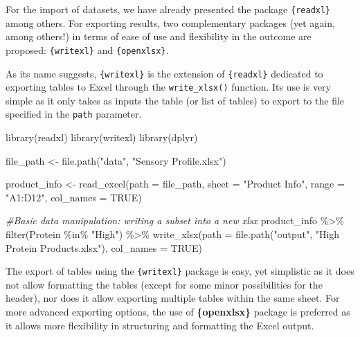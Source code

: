 \documentclass[
]{book}
\newenvironment{Shaded}{\begin{snugshade}}{\end{snugshade}}
\newcommand{\AttributeTok}[1]{\textcolor[rgb]{0.77,0.63,0.00}{#1}}
\newcommand{\CommentTok}[1]{\textcolor[rgb]{0.56,0.35,0.01}{\textit{#1}}}
\newcommand{\ConstantTok}[1]{\textcolor[rgb]{0.00,0.00,0.00}{#1}}
\newcommand{\FunctionTok}[1]{\textcolor[rgb]{0.00,0.00,0.00}{#1}}
\newcommand{\NormalTok}[1]{#1}
\newcommand{\OtherTok}[1]{\textcolor[rgb]{0.56,0.35,0.01}{#1}}
\newcommand{\SpecialCharTok}[1]{\textcolor[rgb]{0.00,0.00,0.00}{#1}}
\newcommand{\StringTok}[1]{\textcolor[rgb]{0.31,0.60,0.02}{#1}}
\begin{document}
For the import of datasets, we have already presented the package \texttt{\{readxl\}} among others. For exporting results, two complementary packages (yet again, among others!) in terms of ease of use and flexibility in the outcome are proposed: \texttt{\{writexl\}} and \texttt{\{openxlsx\}}.

As its name suggests, \texttt{\{writexl\}} is the extension of \texttt{\{readxl\}} dedicated to exporting tables to Excel through the \texttt{write\_xlsx()} function. Its use is very simple as it only takes as inputs the table (or list of tables) to export to the file specified in the \texttt{path} parameter.

\begin{Shaded}
\begin{Highlighting}[]
\FunctionTok{library}\NormalTok{(readxl)}
\FunctionTok{library}\NormalTok{(writexl)}
\FunctionTok{library}\NormalTok{(dplyr)}

\NormalTok{file\_path }\OtherTok{\textless{}{-}} \FunctionTok{file.path}\NormalTok{(}\StringTok{"data"}\NormalTok{, }\StringTok{"Sensory Profile.xlsx"}\NormalTok{)}

\NormalTok{product\_info }\OtherTok{\textless{}{-}} \FunctionTok{read\_excel}\NormalTok{(}\AttributeTok{path  =}\NormalTok{ file\_path,}
                           \AttributeTok{sheet =} \StringTok{"Product Info"}\NormalTok{,}
                           \AttributeTok{range =} \StringTok{"A1:D12"}\NormalTok{,}
                           \AttributeTok{col\_names =} \ConstantTok{TRUE}\NormalTok{)}

\CommentTok{\#Basic data manipulation: writing a subset into a new xlsx}
\NormalTok{product\_info }\SpecialCharTok{\%\textgreater{}\%} 
  \FunctionTok{filter}\NormalTok{(Protein }\SpecialCharTok{\%in\%} \StringTok{"High"}\NormalTok{) }\SpecialCharTok{\%\textgreater{}\%} 
  \FunctionTok{write\_xlsx}\NormalTok{(}\AttributeTok{path =} \FunctionTok{file.path}\NormalTok{(}\StringTok{"output"}\NormalTok{, }\StringTok{"High Protein Products.xlsx"}\NormalTok{),}
             \AttributeTok{col\_names =} \ConstantTok{TRUE}\NormalTok{)}
\end{Highlighting}
\end{Shaded}

The export of tables using the \texttt{\{writexl\}} package is easy, yet simplistic as it does not allow formatting the tables (except for some minor possibilities for the header), nor does it allow exporting multiple tables within the same sheet. For more advanced exporting options, the use of \textbf{\{openxlsx\}} package is preferred as it allows more flexibility in structuring and formatting the Excel output.
\end{document}
